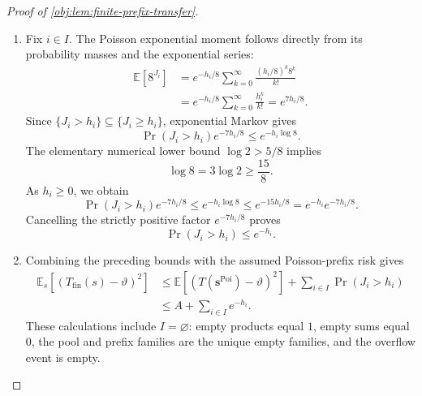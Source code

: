 \begin{proof}[Proof of \cref{obj:lem:finite-prefix-transfer}]
\begin{enumerate}
\item Fix \(i\in I\). The Poisson exponential moment follows directly from its probability masses and the exponential series:
\[
\begin{aligned}
\mathbb E[8^{J_i}]
&=
e^{-h_i/8}
\sum_{k=0}^{\infty}
\frac{(h_i/8)^k8^k}{k!}\\
&=
e^{-h_i/8}
\sum_{k=0}^{\infty}\frac{h_i^k}{k!}
=
e^{7h_i/8}.
\end{aligned}
\]
Since \(\{J_i>h_i\}\subseteq\{J_i\ge h_i\}\), exponential Markov gives
\[
\Pr(J_i>h_i)e^{-7h_i/8}
\le
e^{-h_i\log8}.
\]
The elementary numerical lower bound \(\log2>5/8\) implies
\[
\log8=3\log2\ge\frac{15}{8}.
\]
As \(h_i\ge0\), we obtain
\[
\Pr(J_i>h_i)e^{-7h_i/8}
\le
e^{-h_i\log8}
\le
e^{-15h_i/8}
=
e^{-h_i}e^{-7h_i/8}.
\]
Cancelling the strictly positive factor \(e^{-7h_i/8}\) proves
\[
\Pr(J_i>h_i)\le e^{-h_i}.
\] %

\item Combining the preceding bounds with the assumed Poisson-prefix risk gives
\[
\begin{aligned}
\mathbb E_s[(T_{\mathrm{fin}}(s)-\vartheta)^2]
&\le
\mathbb E[(T(\boldsymbol s^{\mathrm{Poi}})-\vartheta)^2]
+\sum_{i\in I}\Pr(J_i>h_i)\\
&\le
A+\sum_{i\in I}e^{-h_i}.
\end{aligned}
\]
These calculations include \(I=\varnothing\): empty products equal \(1\), empty sums equal \(0\), the pool and prefix families are the unique empty families, and the overflow event is empty. %
\end{enumerate}
\end{proof}
